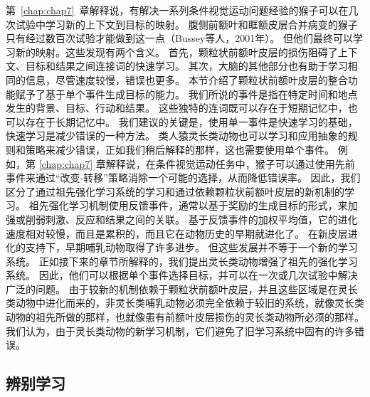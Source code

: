 第~\ref{chap:chap7}~章解释说，有解决一系列条件视觉运动问题经验的猴子可以在几次试验中学习新的上下文到目标的映射。
腹侧前额叶和眶额皮层合并病变的猴子只有经过数百次试验才能做到这一点（Bussey等人，2001年）。
但他们最终可以学习新的映射。这些发现有两个含义。
首先，颗粒状前额叶皮层的损伤阻碍了上下文、目标和结果之间连接词的快速学习。
其次，大脑的其他部分也有助于学习相同的信息，尽管速度较慢，错误也更多。
本节介绍了颗粒状前额叶皮层的整合功能赋予了基于单个事件生成目标的能力。
我们所说的事件是指在特定时间和地点发生的背景、目标、行动和结果。
这些独特的连词既可以存在于短期记忆中，也可以存在于长期记忆中。
我们建议的关键是，使用单一事件是快速学习的基础，快速学习是减少错误的一种方法。
类人猿灵长类动物也可以学习和应用抽象的规则和策略来减少错误，正如我们稍后解释的那样，这也需要使用单个事件。
例如，第 \ref{chap:chap7} 章解释说，在条件视觉运动任务中，猴子可以通过使用先前事件来通过“改变-转移”策略消除一个可能的选择，从而降低错误率。
因此，我们区分了通过祖先强化学习系统的学习和通过依赖颗粒状前额叶皮层的新机制的学习。
祖先强化学习机制使用反馈事件，通常以基于奖励的生成目标的形式，来加强或削弱刺激、反应和结果之间的关联。
基于反馈事件的加权平均值，它的进化速度相对较慢，而且是累积的，而且它在动物历史的早期就进化了。
在新皮层进化的支持下，早期哺乳动物取得了许多进步。
但这些发展并不等于一个新的学习系统。
正如接下来的章节所解释的，我们提出灵长类动物增强了祖先的强化学习系统。
因此，他们可以根据单个事件选择目标，并可以在一次或几次试验中解决广泛的问题。
由于较新的机制依赖于颗粒状前额叶皮层，并且这些区域是在灵长类动物中进化而来的，非灵长类哺乳动物必须完全依赖于较旧的系统，就像灵长类动物的祖先所做的那样，也就像患有前额叶皮层损伤的灵长类动物所必须的那样。
我们认为，由于灵长类动物的新学习机制，它们避免了旧学习系统中固有的许多错误。


\subsection{辨别学习}

